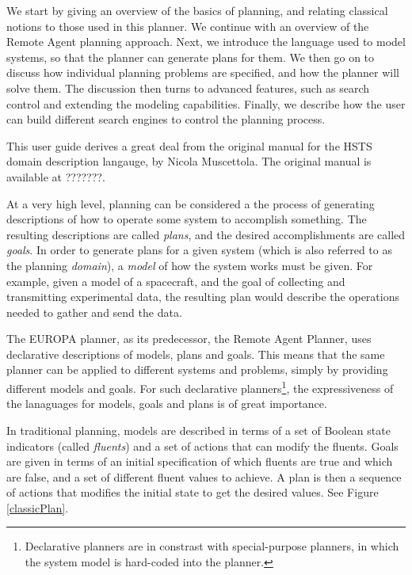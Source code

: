 We start by giving an overview of the basics of planning, and relating
classical notions to those used in this planner.  We continue with an
overview of the Remote Agent planning approach.  Next, we introduce
the language used to model systems, so that the planner can generate
plans for them.  We then go on to discuss how individual planning
problems are specified, and how the planner will solve them.  The
discussion then turns to advanced features, such as search control and
extending the modeling capabilities.  Finally, we describe how the
user can build different search engines to control the planning
process.

This user guide derives a great deal from the original manual for the
HSTS domain description langauge, by Nicola Muscettola.  The original
manual is available at ???????.





At a very high level, planning can be considered a the process of
generating descriptions of how to operate some system to accomplish
something.  The resulting descriptions are called {\em plans}, and the
desired accomplishments are called {\em goals}.  In order to generate
plans for a given system (which is also referred to as the planning
{\em domain}), a {\em model} of how the system works must be given. 
For example, given a model of a spacecraft, and the goal of collecting
and transmitting experimental data, the resulting plan would describe
the operations needed to gather and send the data.

The EUROPA planner, as its predecessor, the Remote Agent Planner, uses
declarative descriptions of models, plans and goals.  This means that
the same planner can be applied to different systems and problems,
simply by providing different models and goals.  For such declarative
planners\footnote{Declarative planners are in constrast with
special-purpose planners, in which the system model is hard-coded into
the planner.}, the expressiveness of the lanaguages for models, goals
and plans is of great importance.

In traditional planning, models are described in terms of a set of
Boolean state indicators (called {\em fluents}) and a set of actions
that can modify the fluents.  Goals are given in terms of an initial
specification of which fluents are true and which are false, and a set
of different fluent values to achieve.  A plan is then a sequence of
actions that modifies the initial state to get the desired values.  
See Figure \ref{classicPlan}.

